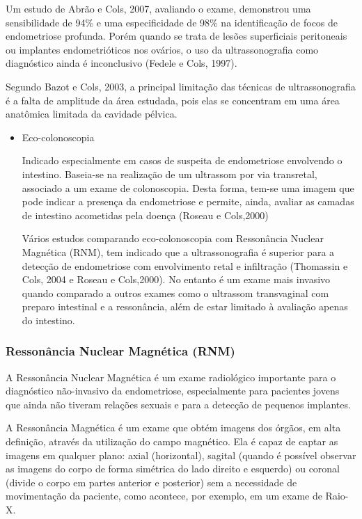 \documentclass[12pt]{article} %
\begin{document}
Um estudo de Abrão e Cols, 2007, avaliando o exame, demonstrou uma sensibilidade de 94\% e uma especificidade de 98\% na identificação de focos de endometriose profunda. Porém quando se trata de lesões superficiais peritoneais ou implantes endometrióticos nos ovários, o uso da ultrassonografia como diagnóstico ainda é inconclusivo (Fedele e Cols, 1997).

Segundo Bazot e Cols, 2003, a principal limitação das técnicas de ultrassonografia é a falta de amplitude da área estudada, pois elas se concentram em uma área anatômica limitada da cavidade pélvica.

\begin{itemize}
\item Eco-colonoscopia

Indicado especialmente em casos de suspeita de endometriose envolvendo o intestino. Baseia-se na realização de um ultrassom por via transretal, associado a um exame de colonoscopia. Desta forma, tem-se uma imagem que pode indicar a presença da endometriose e permite, ainda, avaliar as camadas de intestino acometidas pela doença (Roseau e Cols,2000)

Vários estudos comparando eco-colonoscopia com Ressonância Nuclear Magnética (RNM), tem
indicado que a ultrassonografia é superior para a detecção de endometriose com envolvimento retal e
infiltração (Thomassin e Cols, 2004 e Roseau e Cols,2000). No entanto é um exame mais invasivo quando comparado a outros exames como o ultrassom transvaginal com preparo intestinal e a ressonância, além de estar limitado à avaliação apenas do intestino.
\end{itemize}

\subsubsection{Ressonância Nuclear Magnética (RNM)}

A Ressonância Nuclear Magnética é um exame radiológico importante para o diagnóstico não-invasivo da endometriose, especialmente para pacientes jovens que ainda não tiveram relações sexuais e para a detecção de pequenos implantes.

A Ressonância Magnética é um exame que obtém imagens dos órgãos, em alta definição, através da utilização do campo magnético. Ela é capaz de captar as imagens em qualquer plano: axial (horizontal), sagital (quando é possível observar as imagens do corpo de forma simétrica do lado direito e esquerdo) ou coronal (divide o corpo em partes anterior e posterior) sem a necessidade de movimentação da paciente, como acontece, por exemplo, em um exame de Raio-X.
\end{document}
